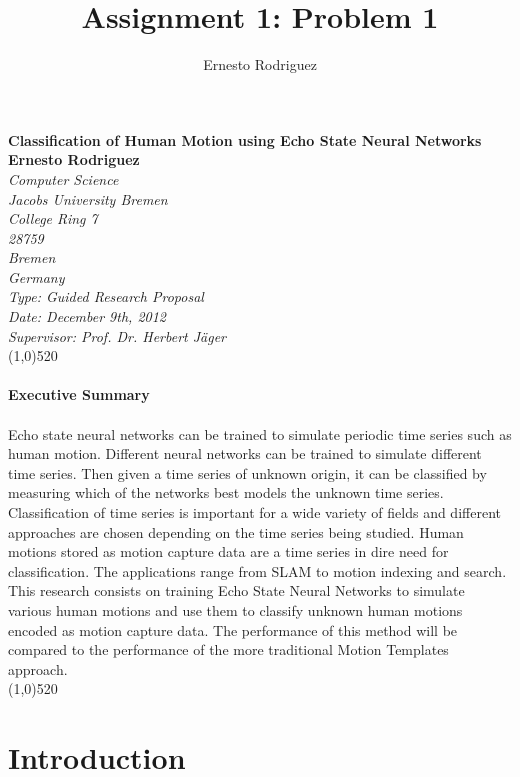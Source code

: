 \documentclass[10pt]{article}
\title{Assignment 1: Problem 1}
\author{Ernesto Rodriguez}
\begin{document}
\Huge{\bf Classification of Human Motion using Echo State Neural Networks\\[1cm]}
\large{\bf Ernesto Rodriguez\\[0.5cm]}
\emph{Computer Science \\ Jacobs University Bremen \\ College Ring 7 \\ 28759 \\ Bremen \\ Germany\\[0.5cm]}
\emph{Type: Guided Research Proposal \\ Date: December 9th, 2012 \\ Supervisor: Prof. Dr. Herbert J\"{a}ger\\}
\line(1,0){520}\\ \\
\Large{\bf Executive Summary\\ \\}
Echo state neural networks can be trained to simulate periodic time series such as human motion. Different neural networks can be trained to simulate different time series. Then given a time series of unknown origin, it can be classified by measuring which of the networks best models the unknown time series. Classification of time series is important for a wide variety of fields and different approaches are chosen depending on the time series being studied. Human motions stored as motion capture data are a time series in dire need for classification. The applications range from SLAM to motion indexing and search. This research consists on training Echo State Neural Networks to simulate various human motions and use them to classify unknown human motions encoded as motion capture data. The performance of this method will be compared to the performance of the more traditional Motion Templates approach. \\
\line(1,0){520}

\section{Introduction}
\end{document}
